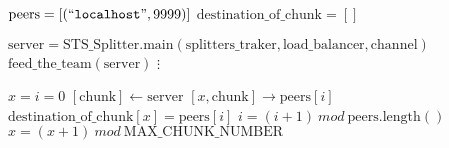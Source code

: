 \documentclass{article}
\begin{document}
\pagestyle{empty}

\newcommand{\send}{\Rightarrow}
\newcommand{\sendto}{\rightarrow}
\newcommand{\recv}{\Leftarrow}
\algrenewcommand\textproc{\textrm}

\begin{algorithmic}

  \algrenewcommand{}

  \State $\text{peers}=[(``\mathtt{localhost}", 9999)]$
  \State $\text{destination\_of\_chunk}=[]$
  
  \State $\text{server}=\text{STS\_Splitter}.\text{main}(\text{splitters\_traker},\text{load\_balancer}, \text{channel})$
  \State $\text{feed\_the\_team}(\text{server})$
  \State $\vdots$
  \EndFunction

  \algrenewcommand{}
  \State $x=i=0$
  \State $[\text{chunk}] \gets \text{server}$
  \State $[x,\text{chunk}] \sendto \text{peers}[i]$
  \State $\text{destination\_of\_chunk}[x]=\text{peers}[i]$
  \State $i=(i+1)~\mathit{mod}~\text{peers}.\text{length}()$
  \State $x=(x+1)~\mathit{mod}~\text{MAX\_CHUNK\_NUMBER}$
  \EndWhile
  \EndProcedure

  \EndProcedure
  
\end{algorithmic}
\end{document}
